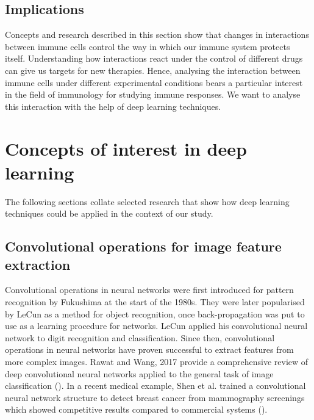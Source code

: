 \subsection{Implications}

Concepts and research described in this section show that changes in interactions between immune cells control the way in which our immune system protects itself. Understanding how interactions react under the control of different drugs can give us targets for new therapies. Hence, analysing the interaction between immune cells under different experimental conditions bears a particular interest in the field of immunology for studying immune responses. We want to analyse this interaction with the help of deep learning techniques.

\section{Concepts of interest in deep learning}

The following sections collate selected research that show how deep learning techniques could be applied in the context of our study.

\subsection{Convolutional operations for image feature extraction}

Convolutional operations in neural networks were first introduced for pattern recognition by Fukushima at the start of the 1980s. They were later popularised by LeCun as a method for object recognition, once back-propagation was put to use as a learning procedure for networks. LeCun applied his convolutional neural network to digit recognition and classification. Since then, convolutional operations in neural networks have proven successful to extract features from more complex images. Rawat and Wang, 2017 provide a comprehensive review of deep convolutional neural networks applied to the general task of image classification (\cite{https://www.mitpressjournals.org/doi/full/10.1162/neco_a_00990}). In a recent medical example, Shen et al. trained a convolutional neural network structure to detect breast cancer from mammography screenings which showed competitive results compared to commercial systems (\cite{https://www.nature.com/articles/s41598-019-48995-4}).

